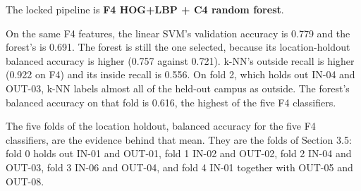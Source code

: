 \documentclass[11pt,a4paper]{article}
\begin{document}
The locked pipeline is \textbf{F4 HOG+LBP + C4 random forest}.

On the same F4 features, the linear SVM's validation accuracy is 0.779 and the forest's is 0.691. The forest is still the one selected, because its location-holdout balanced accuracy is higher (0.757 against 0.721). k-NN's outside recall is higher (0.922 on F4) and its inside recall is 0.556. On fold 2, which holds out IN-04 and OUT-03, k-NN labels almost all of the held-out campus as outside. The forest's balanced accuracy on that fold is 0.616, the highest of the five F4 classifiers.

The five folds of the location holdout, balanced accuracy for the five F4 classifiers, are the evidence behind that mean. They are the folds of Section 3.5: fold 0 holds out IN-01 and OUT-01, fold 1 IN-02 and OUT-02, fold 2 IN-04 and OUT-03, fold 3 IN-06 and OUT-04, and fold 4 IN-01 together with OUT-05 and OUT-08.
\end{document}
